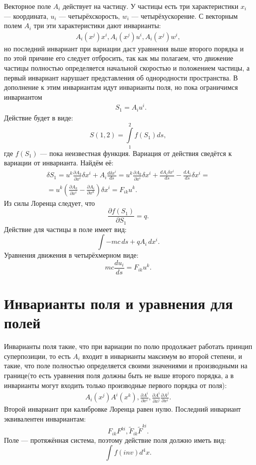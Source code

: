 \documentclass[a4paper,14pt]{extreport} %
\newcommand{\dff}[2]{\frac{\partial #1}{\partial #2}}
\newcommand{\Dff}[2]{\frac{d #1}{d #2}}
\begin{document}
	Векторное поле $A_i$ действует на частицу. У частицы есть три характеристики $x_i$ --- координата, $u_i$ --- четырёхскорость, $w_i$ --- четырёхускорение. С векторным полем $A_i$ три эти характеристики дают инварианты:
	\begin{gather*}
		A_i(x^j) x^i, A_i(x^j) u^i, A_i(x^j) w^i,
	\end{gather*}
	но последний инвариант при вариации даст уравнения выше второго порядка и по этой причине его следует отбросить, так как мы полагаем, что движение частицы полностью определяется начальной скоростью и положением частицы, а первый инвариант нарушает представления об однородности пространства. В дополнение к этим инвариантам идут инварианты поля, но пока ограничимся инвариантом
	\begin{align*}
		& S_1 = A_i u^i.
	\end{align*}
	Действие будет в виде:
	\begin{equation*}
		S(1, 2) = \int\limits_{1}^{2} f(S_1) ds,
	\end{equation*}
	где $f(S_1)$ --- пока неизвестная функция. Вариация от действия сведётся к вариации от инварианта. Найдём её:
	\begin{gather*}
		\delta S_1 = 
		u^k \dff{A_k}{x^i} \delta x^i + A_i \Dff{\delta x^i}{s} = 
		u^k \dff{A_k}{x^i} \delta x^i + \Dff{A_i \delta x^i}{s} - \Dff{A_i}{s} \delta x^i = \\ =
		u^k \left( \dff{A_k}{x^i} - \dff{A_i}{x^k} \right) \delta x^i = F_{ik} u^k.
	\end{gather*}
	Из силы Лоренца следует, что 
	\[
		\dff{f(S_1)}{S_1} = q.
	\]
	Действие для частицы в поле имеет вид:
	\[
		\int - mc\, ds + q A_i\, dx^i.
	\]
	Уравнения движения в четырёхмерном виде:
	\[
		mc \Dff{u_i}{s} = F_{ik} u^k.
	\]
	
	\section{Инварианты поля и уравнения для полей}
	
	 Инварианты поля такие, что при вариации по полю продолжает работать принцип суперпозиции, то есть $A_i$ входит в инварианты максимум во второй степени, и такие, что поле полностью определяется своими значениями и производными на границе(то есть уравнения поля должны быть не выше второго порядка, а в инварианты могут входить только производные первого порядка от поля):
	 \begin{gather*}
	 A_i(x^j) A^i(x^k), \dff{A^i}{x^i}, \dff{A^i}{x^j} \dff{A^j}{x^i}.
	 \end{gather*}
	 Второй инвариант при калибровке Лоренца равен нулю. Последний инвариант эквивалентен инвариантам:
	 \[	
	 	F_{ik}F^{ki}, \tilde{F}_{ik} \tilde{F}^{ki}.
	 \]
	 Поле --- протяжённая система, поэтому действие поля должно иметь вид:
	 \[
	 \int\limits_{} f(inv) d^4 x.
	 \]
	 
	 
	
\end{document}

